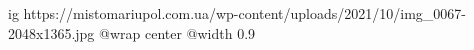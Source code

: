  
 
 
 
 

\ifcmt
  ig https://mistomariupol.com.ua/wp-content/uploads/2021/10/img_0067-2048x1365.jpg
  @wrap center
  @width 0.9
\fi

